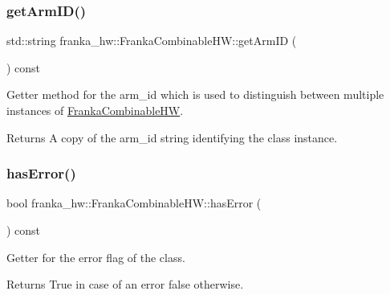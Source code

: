\subsubsection{\texorpdfstring{get\+Arm\+I\+D()}{getArmID()}}
{\footnotesize\ttfamily std\+::string franka\+\_\+hw\+::\+Franka\+Combinable\+H\+W\+::get\+Arm\+ID (\begin{DoxyParamCaption}{ }\end{DoxyParamCaption}) const\hspace{0.3cm}{\ttfamily [noexcept]}}

Getter method for the arm\+\_\+id which is used to distinguish between multiple instances of \hyperlink{classfranka__hw_1_1_franka_combinable_h_w}{Franka\+Combinable\+HW}.

\begin{DoxyReturn}{Returns}
A copy of the arm\+\_\+id string identifying the class instance. 
\end{DoxyReturn}
\mbox{\label{classfranka__hw_1_1_franka_combinable_h_w_a1698d87cf7f2312301f43366a1f13cc2}} 
\subsubsection{\texorpdfstring{has\+Error()}{hasError()}}
{\footnotesize\ttfamily bool franka\+\_\+hw\+::\+Franka\+Combinable\+H\+W\+::has\+Error (\begin{DoxyParamCaption}{ }\end{DoxyParamCaption}) const\hspace{0.3cm}{\ttfamily [noexcept]}}

Getter for the error flag of the class.

\begin{DoxyReturn}{Returns}
True in case of an error false otherwise. 
\end{DoxyReturn}
\mbox{\label{classfranka__hw_1_1_franka_combinable_h_w_a1e89406fc542ad7fb45ff0c1402c61c3}} 

